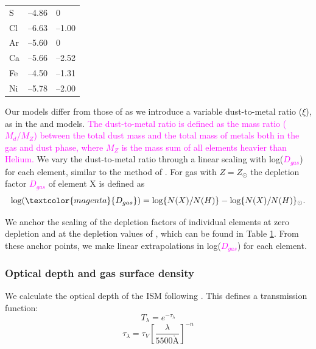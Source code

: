 \documentclass[fleqn,usenatbib]{mnras}
\begin{document}
\begin{table}
\begin{tabularx}{\columnwidth}{p{} p{} p{} }
S                    & --4.86            & 0                                       \\
Cl                   & --6.63            & --1.00                                  \\
Ar                   & --5.60            & 0                                       \\
Ca                   & --5.66            & --2.52                                  \\
Fe                   & --4.50            & --1.31                                  \\
Ni                   & --5.78            & --2.00                                  \\ \hline
\end{tabularx}
\label{tab:metallicities_depletions}
\end{table}

Our models differ from those of \cite{byler2017} as we introduce a variable dust-to-metal ratio ($\xi$), as in the \cite{charlot2001} and \cite{brinchmann2013} models. \textcolor{magenta}{The dust-to-metal ratio is defined as the mass ratio ($M_{d}/M_{Z}$) between the total dust mass and the total mass of metals both in the gas and dust phase, where $M_{Z}$ is the mass sum of all elements heavier than Helium.} We vary the dust-to-metal ratio through a linear scaling with log(\textcolor{magenta}{$D_{gas}$}) for each element,  similar to the method of \cite{jenkins2009}. For gas with $Z = Z_{\odot}$  the depletion factor \textcolor{magenta}{$D_{gas}$} of element X is defined as 
\begin{equation}
    \textrm{log}(\textcolor{magenta}{D_{gas}})=\textrm{log}\{N(X)/N(H)\} - \textrm{log}\{N(X)/N(H)\}_{\odot}.
\end{equation}

We anchor the scaling of the depletion factors of individual elements at zero depletion and at the depletion values of \cite{dopita2013}, which can be found in Table \ref{tab:metallicities_depletions}. From these anchor points, we make linear extrapolations in log(\textcolor{magenta}{$D_{gas}$}) for each element. 

\subsubsection{Optical depth and gas surface density}
We calculate the optical depth of the ISM following \cite{charlot2000}. This defines a transmission function:
\begin{equation}
\label{CH2000_transmission}
    T_{\lambda} = e^{-\tau_{\lambda}}
\end{equation}
\begin{equation}
\label{dust_attenuation}
    \tau_{\lambda} = \tau_{V} \left[ \frac{\lambda}{5500 
\mathring{\mathrm{A}}} \right]^{-n}
\end{equation}
\end{document}
